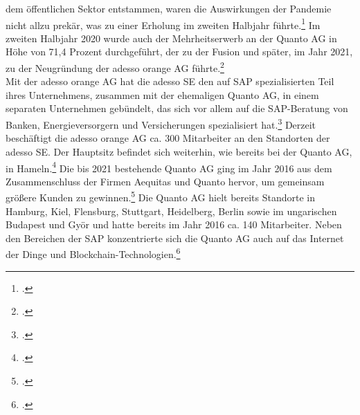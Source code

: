 dem öffentlichen Sektor entstammen, waren die Auswirkungen der Pandemie nicht allzu prekär, was zu einer Erholung im zweiten Halbjahr führte.\footcite[Vgl.][S. 30f]{adesso2020-report} Im zweiten Halbjahr 2020 wurde auch der Mehrheitserwerb an der Quanto AG in Höhe von 71,4 Prozent durchgeführt, der zu der Fusion und später, im Jahr 2021, zu der Neugründung der adesso orange AG führte.\footcite[Vgl.][S. 15]{adesso2020-report} 
\\Mit der adesso orange AG hat die adesso SE den auf SAP spezialisierten Teil ihres Unternehmens, zusammen mit der ehemaligen Quanto AG, in einem separaten Unternehmen gebündelt, das sich vor allem auf die SAP-Beratung von Banken, Energieversorgern und Versicherungen spezialisiert hat.\footcite[Vgl.][]{ao-main} Derzeit beschäftigt die adesso orange AG ca. 300 Mitarbeiter an den Standorten der adesso SE. Der Hauptsitz befindet sich weiterhin, wie bereits bei der Quanto AG, in Hameln.\footcite[Vgl.][]{ao-karriere}
Die bis 2021 bestehende Quanto AG ging im Jahr 2016 aus dem Zusammenschluss der Firmen \glqq{}Aequitas\grqq{} und \glqq{}Quanto\grqq{} hervor, um gemeinsam größere Kunden zu gewinnen.\footcite[Vgl.][]{ww-quanto} Die Quanto AG hielt bereits Standorte in Hamburg, Kiel, Flensburg, Stuttgart, Heidelberg, Berlin sowie im ungarischen Budapest und Györ und hatte bereits im Jahr 2016 ca. 140 Mitarbeiter. Neben den Bereichen der SAP konzentrierte sich die Quanto AG auch auf das \glqq{}Internet der Dinge\grqq{} und Blockchain-Technologien.\footcite[Vgl.][]{ww-quanto}

